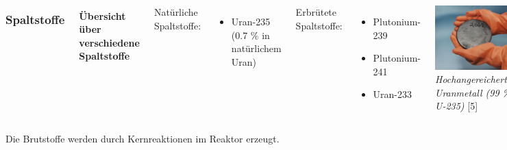 \documentclass{beamer}[9pt]
\begin{document}
\begin{frame}
\begin{columns}
\frametitle{Spaltstoffe}
\framesubtitle{Übersicht über verschiedene Spaltstoffe}

Natürliche Spaltstoffe:
\begin{itemize}
\item Uran-235 (0.7 \% in natürlichem Uran)
\end{itemize}
Erbrütete Spaltstoffe:
\begin{itemize}
\item Plutonium-239
\item Plutonium-241
\item Uran-233

\end{itemize}
\includegraphics[scale=0.55]{HEUranium.jpg}\\
\textit{Hochangereichertes Uranmetall (99 \% U-235)} [5]
\end{columns}
\vspace{1em}
Die Brutstoffe werden durch Kernreaktionen im Reaktor erzeugt.
\end{frame}
\end{document}
